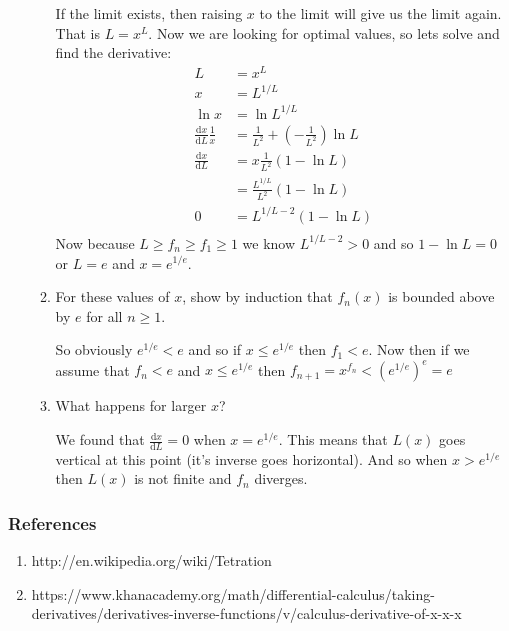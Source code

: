 \documentclass[letterpaper]{article}
\begin{document}
\begin{enumerate}
\begin{enumerate}
    If the limit exists, then raising $x$ to the limit will give us the limit again. That is $L=x^{L}$. Now we are looking for optimal values, so lets solve and find the derivative:
    \begin{align*}
      L&=x^L\\
      x&=L^{1/L}\\
      \ln x&=\ln L^{1/L}\\
      \frac{\mathrm{d}x}{\mathrm{d}L}\frac{1}{x}&=\frac{1}{L^2}+\left(-\frac{1}{L^2}\right)\ln L\\
      \frac{\mathrm{d}x}{\mathrm{d}L}&=x\frac{1}{L^2}(1-\ln L)\\
      &=\frac{L^{1/L}}{L^2}(1-\ln L)\\
      0&=L^{1/L-2}(1-\ln L)\\
    \end{align*}
    Now because $L\ge f_n\ge f_1\ge 1$ we know $L^{1/L-2}>0$ and so $1-\ln L=0$ or $L=e$ and $x=e^{1/e}$.
  \item
    For these values of $x$, show by induction that $f_n(x)$ is bounded above by $e$ for all $n\ge 1$.

    So obviously $e^{1/e}< e$ and so if $x\le e^{1/e}$ then $f_1< e$. Now then if we assume that $f_n< e$ and $x\le e^{1/e}$ then $f_{n+1}=x^{f_n}< \left(e^{1/e}\right)^e=e$
  \item
    What happens for larger $x$?

    We found that $\frac{\mathrm{d}x}{\mathrm{d}L}=0$ when $x=e^{1/e}$. This means that $L(x)$ goes vertical at this point (it's inverse goes horizontal). And so when $x>e^{1/e}$ then $L(x)$ is not finite and $f_n$ diverges.
  \end{enumerate}
\end{enumerate}
\subsubsection*{References}
\begin{enumerate}
\item
http://en.wikipedia.org/wiki/Tetration
\item
https://www.khanacademy.org/math/differential-calculus/taking-derivatives/derivatives-inverse-functions/v/calculus-derivative-of-x-x-x
\end{enumerate}
\end{document}
